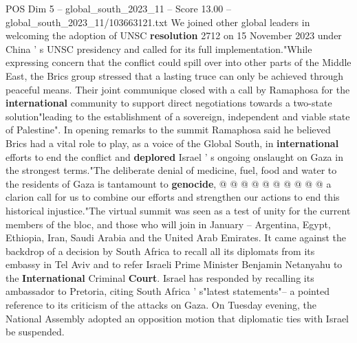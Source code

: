 \begin{textsample}{POS Dim 5 – global\_south\_2023\_11 – Score 13.00 – global\_south\_2023\_11/103663121.txt}
We joined other global leaders in welcoming the adoption of UNSC \textbf{resolution} 2712 on 15 November 2023 under China ' s UNSC presidency and called for its full implementation."While expressing concern that the conflict could spill over into other parts of the Middle East, the Brics group stressed that a lasting truce can only be achieved through peaceful means.
Their joint communique closed with a call by Ramaphosa for the \textbf{international} community to support direct negotiations towards a two-state solution"leading to the establishment of a sovereign, independent and viable state of Palestine".
In opening remarks to the summit Ramaphosa said he believed Brics had a vital role to play, as a voice of the Global South, in \textbf{international} efforts to end the conflict and \textbf{deplored} Israel ' s ongoing onslaught on Gaza in the strongest terms."The deliberate denial of medicine, fuel, food and water to the residents of Gaza is tantamount to \textbf{genocide}, @ @ @ @ @ @ @ @ @ @ a clarion call for us to combine our efforts and strengthen our actions to end this historical injustice."The virtual summit was seen as a test of unity for the current members of the bloc, and those who will join in January -- Argentina, Egypt, Ethiopia, Iran, Saudi Arabia and the United Arab Emirates.
It came against the backdrop of a decision by South Africa to recall all its diplomats from its embassy in Tel Aviv and to refer Israeli Prime Minister Benjamin Netanyahu to the \textbf{International} Criminal \textbf{Court}.
Israel has responded by recalling its ambassador to Pretoria, citing South Africa ' s"latest statements"-- a pointed reference to its criticism of the attacks on Gaza.
On Tuesday evening, the National Assembly adopted an opposition motion that diplomatic ties with Israel be suspended.

\end{textsample}
